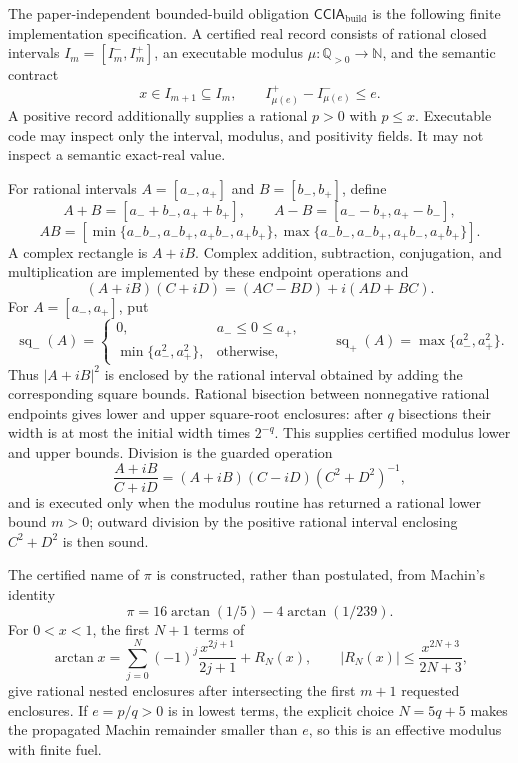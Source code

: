 The paper-independent bounded-build obligation \(\mathsf{CCIA}_{\mathrm{build}}\) is the following finite implementation specification.  A certified real record consists of rational closed intervals \(I_m=[I_m^-,I_m^+]\), an executable modulus \(\mu:\mathbb Q_{>0}\to\mathbb N\), and the semantic contract
\[
 x\in I_{m+1}\subseteq I_m,
 \qquad
 I_{\mu(e)}^+-I_{\mu(e)}^-\le e.
\]
A positive record additionally supplies a rational \(p>0\) with \(p\le x\).  Executable code may inspect only the interval, modulus, and positivity fields.  It may not inspect a semantic exact-real value.

For rational intervals \(A=[a_-,a_+]\) and \(B=[b_-,b_+]\), define
\[
 A+B=[a_-+b_-,a_++b_+],
 \qquad
 A-B=[a_--b_+,a_+-b_-],
\]
\[
 A B=
 [\min\{a_-b_-,a_-b_+,a_+b_-,a_+b_+\},
  \max\{a_-b_-,a_-b_+,a_+b_-,a_+b_+\}].
\]
A complex rectangle is \(A+iB\).  Complex addition, subtraction, conjugation, and multiplication are implemented by these endpoint operations and
\[
 (A+iB)(C+iD)=(AC-BD)+i(AD+BC).
\]
For \(A=[a_-,a_+]\), put
\[
 \operatorname{sq}_{-}(A)=
 \begin{cases}
 0,&a_-\le0\le a_+,\\
 \min\{a_-^2,a_+^2\},&\text{otherwise},
 \end{cases}
 \qquad
 \operatorname{sq}_{+}(A)=\max\{a_-^2,a_+^2\}.
\]
Thus \(|A+iB|^2\) is enclosed by the rational interval obtained by adding the corresponding square bounds.  Rational bisection between nonnegative rational endpoints gives lower and upper square-root enclosures: after \(q\) bisections their width is at most the initial width times \(2^{-q}\).  This supplies certified modulus lower and upper bounds.  Division is the guarded operation
\[
 \frac{A+iB}{C+iD}
 =(A+iB)(C-iD)(C^2+D^2)^{-1},
\]
and is executed only when the modulus routine has returned a rational lower bound \(m>0\); outward division by the positive rational interval enclosing \(C^2+D^2\) is then sound.

The certified name of \(\pi\) is constructed, rather than postulated, from Machin's identity
\[
 \pi=16\arctan(1/5)-4\arctan(1/239).
\]
For \(0<x<1\), the first \(N+1\) terms of
\[
 \arctan x=\sum_{j=0}^{N}(-1)^j\frac{x^{2j+1}}{2j+1}+R_N(x),
 \qquad
 |R_N(x)|\le\frac{x^{2N+3}}{2N+3},
\]
give rational nested enclosures after intersecting the first \(m+1\) requested enclosures.  If \(e=p/q>0\) is in lowest terms, the explicit choice \(N=5q+5\) makes the propagated Machin remainder smaller than \(e\), so this is an effective modulus with finite fuel.

